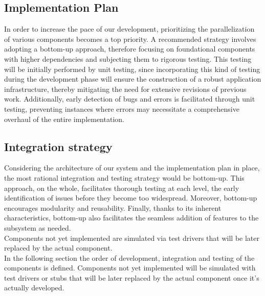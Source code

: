 \documentclass[../DD.tex]{subfiles}
\begin{document}
    \subsection{Implementation Plan}
        In order to increase the pace of our development, prioritizing the parallelization of various components becomes a top priority. A recommended strategy involves adopting a bottom-up approach, therefore focusing on foundational components with higher dependencies and subjecting them to rigorous testing. This testing will be initially performed by unit testing, since incorporating this kind of testing during the development phase will ensure the construction of a robust application infrastructure, thereby mitigating the need for extensive revisions of previous work. Additionally, early detection of bugs and errors is facilitated through unit testing, preventing instances where errors may necessitate a comprehensive overhaul of the entire implementation.

    \subsection{Integration strategy}
        Considering the architecture of our system and the implementation plan in place, the most rational integration and testing strategy would be bottom-up. This approach, on the whole, facilitates thorough testing at each level, the early identification of issues before they become too widespread. Moreover, bottom-up encourages modularity and reusability. Finally, thanks to its inherent characteristics, bottom-up also facilitates the seamless addition of features to the subsystem as needed.\\
        Components not yet implemented are simulated via test drivers that will be later replaced by the actual component.\\
        In the following section the order of development, integration and testing of the  components is defined. Components not yet implemented will be simulated with test drivers or stubs that will be later replaced by the actual component once it's actually developed.
        \newpage
\end{document}
